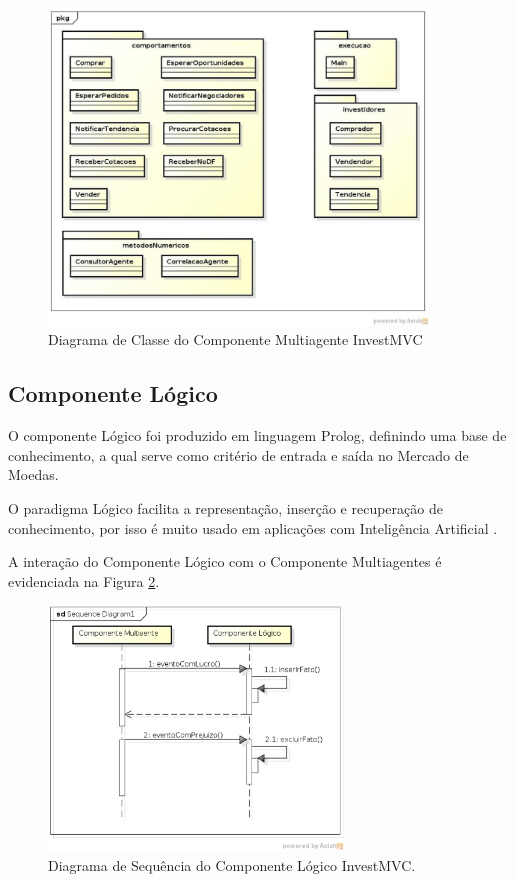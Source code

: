 \begin{figure}[H]
\centering
\includegraphics[width=0.9\textwidth]{figuras/diagramaClassesSMA}
\caption{Diagrama de Classe do Componente Multiagente InvestMVC} 
\label{diagramaClassesSMA}
\end{figure}

\subsection{Componente Lógico}

O componente Lógico foi produzido em linguagem Prolog, definindo uma base de conhecimento, a qual serve como critério de entrada e saída no Mercado de Moedas.

O paradigma Lógico facilita a representação, inserção e recuperação de conhecimento, por isso é muito usado em aplicações com Inteligência Artificial \cite{almeida2010}.

A interação do Componente Lógico com o Componente Multiagentes é evidenciada na Figura \ref{sequenciaLogico}.

\begin{figure}[H]
\centering
\includegraphics[width=0.7\textwidth]{figuras/sequenciaLogico}
\caption{Diagrama de Sequência do Componente Lógico InvestMVC.}
\label{sequenciaLogico}
\end{figure}

